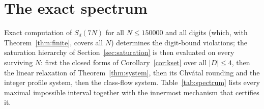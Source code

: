 \documentclass[11pt]{article}
\theoremstyle{definition}
\theoremstyle{remark}
\newcommand{\Sd}[2]{S_{#1}(#2)}
\begin{document}
\section{The exact spectrum}\label{sec:spectrum}

Exact computation of $\Sd{d}{7N}$ for all $N\le 150000$ and all digits (which, with Theorem~\ref{thm:finite}, covers all $N$) determines the digit-bound violations; the saturation hierarchy of Section~\ref{sec:saturation} is then evaluated on every surviving $N$: first the closed forms of Corollary~\ref{cor:kset} over all $|D|\le 4$, then the linear relaxation of Theorem~\ref{thm:system}, then its Chv\'atal rounding and the integer profile system, then the class-flow system. Table~\ref{tab:spectrum} lists every maximal impossible interval together with the innermost mechanism that certifies it.
\end{document}
